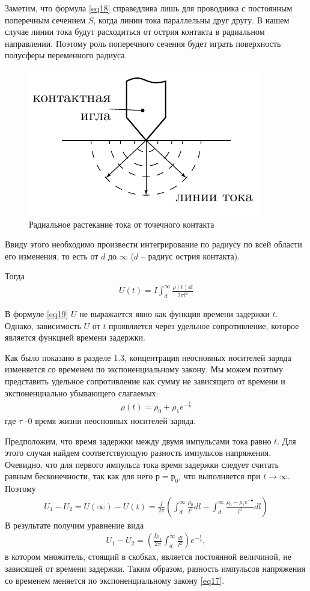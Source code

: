 Заметим, что формула \eqref{eq18} справедлива лишь для проводника с постоянным поперечным сечением $S$, когда линии тока параллельны друг другу. 
В нашем случае линии тока будут расходиться от острия контакта в радиальном направлении. Поэтому роль поперечного сечения будет играть поверхность полусферы переменного радиуса.
\begin{figure}[H]
	\centering
	\includegraphics[width = 0.5\linewidth]{fig/curr.pdf}
	\caption{Радиальное растекание тока от точечного контакта}
	\label{fig:figure10}
\end{figure}

Ввиду этого необходимо произвести интегрирование по радиусу по всей области его изменения, то есть от $d$ до $\infty$ ($d$ -- радиус острия контакта). 

Тогда
\begin{gather}
	\label{eq19}
	U(t)=I \int_{d}^{\infty} \frac{\rho(t) \dd l}{2 \pi l^{2}}
\end{gather}

В формуле \eqref{eq19} $U$ не выражается явно как функция времени задержки $t$. Однако, зависимость $U$ от $t$ проявляется через удельное сопротивление, которое является функцией времени задержки.

Как было показано в разделе 1.3, концентрация неосновных носителей заряда изменяется со временем по экспоненциальному закону. Мы можем поэтому представить удельное сопротивление как сумму не зависящего от времени и экспоненциально убывающего слагаемых: 
\begin{gather}
	\label{eq20}
	\rho(t)=\rho_{0}+\rho_{1} e^{-\frac{t}{\tau}}
\end{gather}
где $\tau$ -0 время жизни неосновных носителей заряда.

Предположим, что время задержки между двумя импульсами тока равно $t$. Для этого случая найдем соответствующую разность
импульсов напряжения. Очевидно, что для первого импульса тока время задержки следует считать равным бесконечности, так
как для него $р = р_0$, что выполняется при $t\to\infty$. Поэтому
\begin{gather}
	\label{eq21}
	U_{1}-U_{2}=U(\infty)-U(t)=\frac{I}{2 \pi}\left(\int_{d}^{\infty} \frac{\rho_{0}}{l^{2}} d l-\int_{d}^{\infty} \frac{\rho_{0}-\rho_{1} e^{-\frac{t}{\tau}}}{l^{2}} d l\right)
\end{gather}
В результате получим уравнение вида
\begin{gather}
 	\label{eq22}
 	U_{1}-U_{2}=\left(\frac{I \rho_{1}}{2 \pi} \int_{d}^{\infty} \frac{d l}{l^{2}}\right) e^{-\frac{t}{\tau}},
 \end{gather}
 в котором множитель, стоящий в скобках, является постоянной величиной, не зависящей от времени задержки. Таким образом,
 разность импульсов напряжения со временем меняется по экспоненциальному закону \eqref{eq17}.


